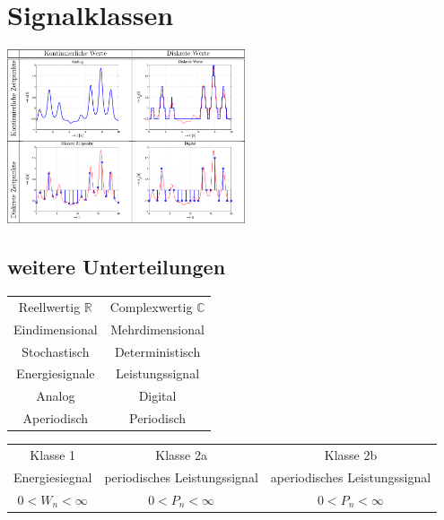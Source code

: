 \section{Signalklassen}
\begin{multicols}{2}
    \includegraphics[width = 7cm]{img/Signalklassen.png}
    \subsection{weitere Unterteilungen}
    \begin{tabular}{|c|c|}
        Reellwertig $\mathbb{R}$ & Complexwertig $\mathbb{C}$ \\
        Eindimensional           & Mehrdimensional            \\
        Stochastisch             & Deterministisch            \\
        Energiesignale           & Leistungssignal            \\
        Analog                   & Digital                    \\
        Aperiodisch              & Periodisch                 \\
    \end{tabular}
\end{multicols}
\begin{tabular}{ccc}
    Klasse 1            &
    Klasse 2a           &
    Klasse 2b                                                                          \\
    Energiesiegnal      & periodisches Leistungssignal & aperiodisches Leistungssignal \\
    $0 < W_n < \infty $ & $0 < P_n < \infty $          & $0 < P_n < \infty$
\end{tabular}
